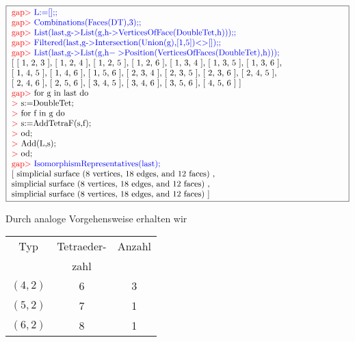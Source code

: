 \documentclass[12pt,titlepage,twoside,cleardoublepage]{article}
\theoremstyle{nummermitklammern}
\numberwithin{equation}{section}
\begin{document}
 \begin{center}
 $\fbox{
\parbox{14cm}{
\textcolor{red}{gap$>$} \textcolor{blue}{L:=[];;}\newline
\textcolor{red}{gap$>$} \textcolor{blue}{Combinations(Faces(DT),3);;}\newline
\textcolor{red}{gap$>$} \textcolor{blue}{List(last,g-$>$List(g,h-$>$VerticesOfFace(DoubleTet,h)));;}\newline
\textcolor{red}{gap$>$} \textcolor{blue}{Filtered(last,g-$>$Intersection(Union(g),[1,5])$<>$[]);;}\newline
\textcolor{red}{gap$>$} \textcolor{blue}{List(last,g-$>$List(g,h$->$Position(VerticesOfFaces(DoubleTet),h)));}\newline
[ [ 1, 2, 3 ], [ 1, 2, 4 ], [ 1, 2, 5 ], [ 1, 2, 6 ], [ 1, 3, 4 ],
  [ 1, 3, 5 ], [ 1, 3, 6 ], \newline
  [ 1, 4, 5 ], [ 1, 4, 6 ], [ 1, 5, 6 ],
  [ 2, 3, 4 ], [ 2, 3, 5 ], [ 2, 3, 6 ], [ 2, 4, 5 ], 
 \newline
  [ 2, 4, 6 ], [ 2, 5, 6 ], [ 3, 4, 5 ], [ 3, 4, 6 ], [ 3, 5, 6 ], [ 4, 5, 6 ] ]\newline
\textcolor{red}{gap$>$} for g in last do\newline
\textcolor{red}{$>$} s:=DoubleTet;\newline
\textcolor{red}{$>$} for f in g do\newline
\textcolor{red}{$>$} s:=AddTetraF(s,f);\newline
\textcolor{red}{$>$} od;\newline
\textcolor{red}{$>$} Add(L,s);\newline
\textcolor{red}{$>$} od;\newline
\textcolor{red}{gap$>$} \textcolor{blue}{IsomorphismRepresentatives(last);}\newline
[ simplicial surface (8 vertices, 18 edges, and 12 faces)
    ,\newline
     simplicial surface (8 vertices, 18 edges, and 12 faces)
    ,\newline
  simplicial surface (8 vertices, 18 edges, and 12 faces)
 ]
}}$ 
\end{center}  
Durch analoge Vorgehensweise erhalten wir
\begin{center}
\begin{tabular}{|c|c|c|}
\hline
 Typ&Tetraeder-  & Anzahl\\
&zahl &\\
\hline
$(4,2)$&6& 3\\
\hline
$(5,2)$&7& 1\\
\hline
$(6,2)$&8& 1\\
\hline
\end{tabular}
\end{center}
\end{document}

